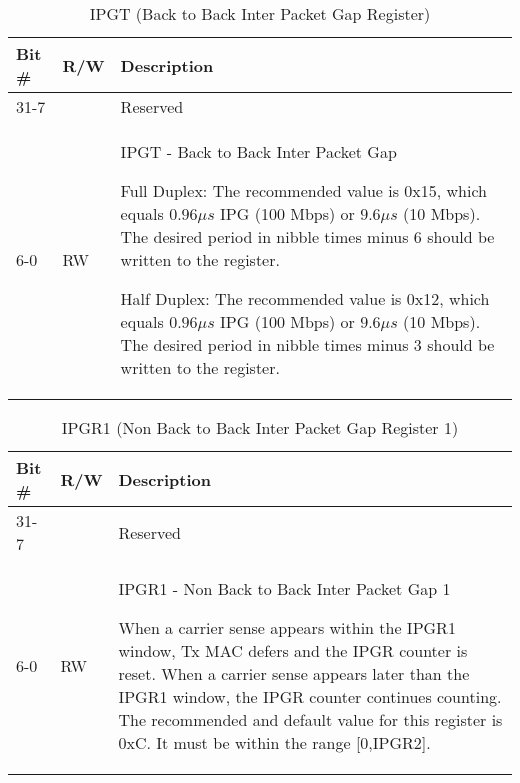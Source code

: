 \begin{table}[H]
  \centering
  \begin{tabularx}{\textwidth}{|l|l|X|}
    
    \hline
    \rowcolor{iob-green}
    {\bf Bit \#} & {\bf R/W} & {\bf Description} \\ \hline

    31-7   &   & Reserved \\ \hline
    \rowcolor{iob-blue}
    6-0      & RW & IPGT - Back to Back Inter Packet Gap

                Full Duplex: The recommended value is 0x15, which equals
                $0.96\mu s$ IPG (100 Mbps) or $9.6\mu s$ (10 Mbps). The desired
                period in nibble times minus 6 should be written to the
                register.

                Half Duplex: The recommended value is 0x12, which equals
                $0.96\mu s$ IPG (100 Mbps) or $9.6\mu s$ (10 Mbps). The desired
                period in nibble times minus 3 should be written to the
                register. \\ \hline
  \end{tabularx}
    \caption{IPGT (Back to Back Inter Packet Gap Register)}
  \label{swreg_details:ipgt}
\end{table}

\begin{table}[H]
  \centering
  \begin{tabularx}{\textwidth}{|l|l|X|}
    
    \hline
    \rowcolor{iob-green}
    {\bf Bit \#} & {\bf R/W} & {\bf Description} \\ \hline

    31-7   &   & Reserved \\ \hline
    \rowcolor{iob-blue}
    6-0      & RW & IPGR1 - Non Back to Back Inter Packet Gap 1

                When a carrier sense appears within the IPGR1 window, Tx MAC
                defers and the IPGR counter is reset. When a carrier sense
                appears later than the IPGR1 window, the IPGR counter continues
                counting. The recommended and default value for this register
                is 0xC. It must be within the range [0,IPGR2]. \\ \hline
  \end{tabularx}
    \caption{IPGR1 (Non Back to Back Inter Packet Gap Register 1)}
  \label{swreg_details:ipgr1}
\end{table}

